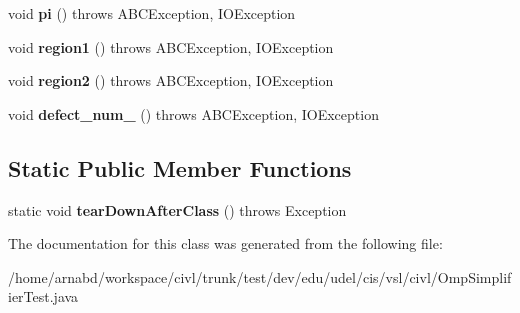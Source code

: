\begin{DoxyCompactItemize}
\item 
\hypertarget{classedu_1_1udel_1_1cis_1_1vsl_1_1civl_1_1OmpSimplifierTest_a39bc1710b8399607e21084d1daa0006e}{}void {\bfseries pi} ()  throws A\+B\+C\+Exception, I\+O\+Exception \label{classedu_1_1udel_1_1cis_1_1vsl_1_1civl_1_1OmpSimplifierTest_a39bc1710b8399607e21084d1daa0006e}

\item 
\hypertarget{classedu_1_1udel_1_1cis_1_1vsl_1_1civl_1_1OmpSimplifierTest_a06d3f310c3fbc74746c4755882203ac4}{}void {\bfseries region1} ()  throws A\+B\+C\+Exception, I\+O\+Exception \label{classedu_1_1udel_1_1cis_1_1vsl_1_1civl_1_1OmpSimplifierTest_a06d3f310c3fbc74746c4755882203ac4}

\item 
\hypertarget{classedu_1_1udel_1_1cis_1_1vsl_1_1civl_1_1OmpSimplifierTest_a35387e532e70da1bb0b88dba8e166ebd}{}void {\bfseries region2} ()  throws A\+B\+C\+Exception, I\+O\+Exception \label{classedu_1_1udel_1_1cis_1_1vsl_1_1civl_1_1OmpSimplifierTest_a35387e532e70da1bb0b88dba8e166ebd}

\item 
\hypertarget{classedu_1_1udel_1_1cis_1_1vsl_1_1civl_1_1OmpSimplifierTest_a4b724720d2856dd0cb44a8c39f169b33}{}void {\bfseries defect\+\_\+num\+\_} ()  throws A\+B\+C\+Exception, I\+O\+Exception \label{classedu_1_1udel_1_1cis_1_1vsl_1_1civl_1_1OmpSimplifierTest_a4b724720d2856dd0cb44a8c39f169b33}

\end{DoxyCompactItemize}
\subsection*{Static Public Member Functions}
\begin{DoxyCompactItemize}
\item 
\hypertarget{classedu_1_1udel_1_1cis_1_1vsl_1_1civl_1_1OmpSimplifierTest_af88c5298dcdfb633398ff45db84e40b7}{}static void {\bfseries tear\+Down\+After\+Class} ()  throws Exception \label{classedu_1_1udel_1_1cis_1_1vsl_1_1civl_1_1OmpSimplifierTest_af88c5298dcdfb633398ff45db84e40b7}

\end{DoxyCompactItemize}


The documentation for this class was generated from the following file\+:\begin{DoxyCompactItemize}
\item 
/home/arnabd/workspace/civl/trunk/test/dev/edu/udel/cis/vsl/civl/Omp\+Simplifier\+Test.\+java\end{DoxyCompactItemize}
